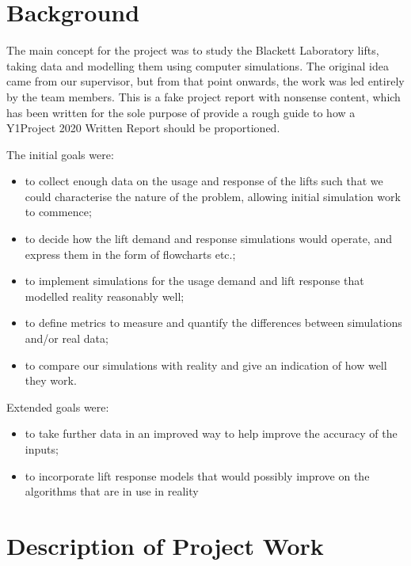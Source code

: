 \documentclass[12pt,a4paper,onecolumn]{Imperial_lab_report}
\begin{document}
\section{Background}
The main concept for the project was to study the Blackett Laboratory lifts, taking data and modelling them using computer simulations. The original idea came from our supervisor, but from that point onwards, the work was led entirely by the team members.
This is a fake project report with nonsense content, which has been written for the sole purpose of provide a rough guide to how a Y1Project 2020 Written Report should be proportioned.

The initial goals were: 
\begin{itemize}
  \item to collect enough data on the usage and response of the lifts such that we could characterise the nature of the problem, allowing initial simulation work to commence;
  \item to decide how the lift demand and response simulations would operate, and express them in the form of flowcharts etc.;
  \item to implement simulations for the usage demand and lift response that modelled reality reasonably well;
  \item to define metrics to measure and quantify the differences between simulations and/or real data;
  \item to compare our simulations with reality and give an indication of how well they work.
\end{itemize}
Extended goals were:
\begin{itemize}
  \item to take further data in an improved way to help improve the accuracy of the inputs;
  \item to incorporate lift response models that would possibly improve on the algorithms that are in use in reality
\end{itemize}

\section{Description of Project Work} %
%
\end{document}
